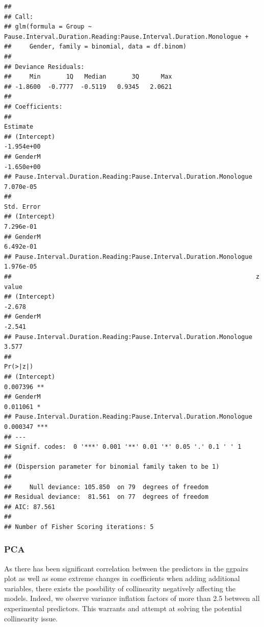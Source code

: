 \documentclass[
  english,
  doc,floatsintext]{apa6}
\begin{document}
\begin{verbatim}
## 
## Call:
## glm(formula = Group ~ Pause.Interval.Duration.Reading:Pause.Interval.Duration.Monologue + 
##     Gender, family = binomial, data = df.binom)
## 
## Deviance Residuals: 
##     Min       1Q   Median       3Q      Max  
## -1.8600  -0.7777  -0.5119   0.9345   2.0621  
## 
## Coefficients:
##                                                                     Estimate
## (Intercept)                                                       -1.954e+00
## GenderM                                                           -1.650e+00
## Pause.Interval.Duration.Reading:Pause.Interval.Duration.Monologue  7.070e-05
##                                                                   Std. Error
## (Intercept)                                                        7.296e-01
## GenderM                                                            6.492e-01
## Pause.Interval.Duration.Reading:Pause.Interval.Duration.Monologue  1.976e-05
##                                                                   z value
## (Intercept)                                                        -2.678
## GenderM                                                            -2.541
## Pause.Interval.Duration.Reading:Pause.Interval.Duration.Monologue   3.577
##                                                                   Pr(>|z|)    
## (Intercept)                                                       0.007396 ** 
## GenderM                                                           0.011061 *  
## Pause.Interval.Duration.Reading:Pause.Interval.Duration.Monologue 0.000347 ***
## ---
## Signif. codes:  0 '***' 0.001 '**' 0.01 '*' 0.05 '.' 0.1 ' ' 1
## 
## (Dispersion parameter for binomial family taken to be 1)
## 
##     Null deviance: 105.850  on 79  degrees of freedom
## Residual deviance:  81.561  on 77  degrees of freedom
## AIC: 87.561
## 
## Number of Fisher Scoring iterations: 5
\end{verbatim}

\hypertarget{pca}{%
\subsubsection{PCA}\label{pca}}

As there has been significant correlation between the predictors in the ggpairs plot
as well as some extreme changes in coefficients when adding additional variables,
there exists the possbility of collinearity negatively affecting the models. Indeed,
we observe variance inflation factors of more than 2.5 between all experimental predictors.
This warrants and attempt at solving the potential collinearity issue.
\end{document}

